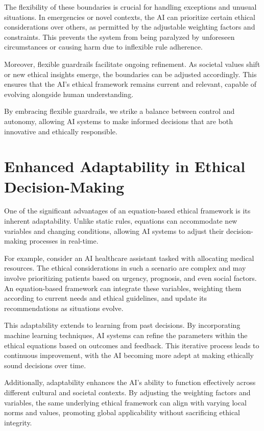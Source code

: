 \documentclass[12pt]{article}
\begin{document}
The flexibility of these boundaries is crucial for handling exceptions and unusual situations. In emergencies or novel contexts, the AI can prioritize certain ethical considerations over others, as permitted by the adjustable weighting factors and constraints. This prevents the system from being paralyzed by unforeseen circumstances or causing harm due to inflexible rule adherence.

Moreover, flexible guardrails facilitate ongoing refinement. As societal values shift or new ethical insights emerge, the boundaries can be adjusted accordingly. This ensures that the AI's ethical framework remains current and relevant, capable of evolving alongside human understanding.

By embracing flexible guardrails, we strike a balance between control and autonomy, allowing AI systems to make informed decisions that are both innovative and ethically responsible.

\newpage



\section{Enhanced Adaptability in Ethical Decision-Making}

One of the significant advantages of an equation-based ethical framework is its inherent adaptability. Unlike static rules, equations can accommodate new variables and changing conditions, allowing AI systems to adjust their decision-making processes in real-time.

For example, consider an AI healthcare assistant tasked with allocating medical resources. The ethical considerations in such a scenario are complex and may involve prioritizing patients based on urgency, prognosis, and even social factors. An equation-based framework can integrate these variables, weighting them according to current needs and ethical guidelines, and update its recommendations as situations evolve.

This adaptability extends to learning from past decisions. By incorporating machine learning techniques, AI systems can refine the parameters within the ethical equations based on outcomes and feedback. This iterative process leads to continuous improvement, with the AI becoming more adept at making ethically sound decisions over time.

Additionally, adaptability enhances the AI's ability to function effectively across different cultural and societal contexts. By adjusting the weighting factors and variables, the same underlying ethical framework can align with varying local norms and values, promoting global applicability without sacrificing ethical integrity.
\end{document}

